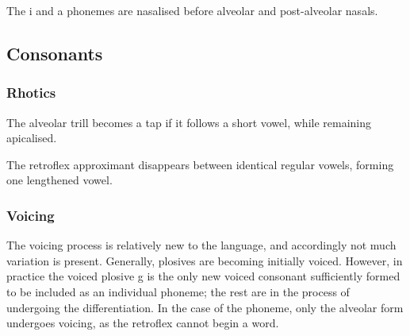 \begin{quote}
\end{quote}

The i and a phonemes are nasalised before alveolar and post-alveolar nasals.

\begin{quote}
\begin{multicols}{2}
\phonc{i}{\textipa{\~i}}{\oneof{\phold \textipa{\|]{n}}\\ \phold
    \textipa{\textsubsquare{n}}}}

\phonc{a}{\textipa{\~a}}{\oneof{\phold \textipa{\|]{n}}\\ \phold
    \textipa{\textsubsquare{n}}}}
\end{multicols}
\end{quote}

\subsection{Consonants}

\subsubsection{Rhotics}

The alveolar trill becomes a tap if it follows a short vowel, while remaining
apicalised.

\begin{quote}
\phonl{\textipa{\|]r}}{\textipa{\|]R}}{\oneof{a\\u\\i}}
\end{quote}

The retroflex approximant \textipa{\textturnrrtail} disappears between identical
regular vowels, forming one lengthened vowel.

\begin{quote}
\end{quote}

\subsubsection{Voicing}

The voicing process is relatively new to the language, and accordingly not much
variation is present. Generally, plosives are becoming initially voiced.
However, in practice the voiced plosive g is the only new voiced consonant
sufficiently formed to be included as an individual phoneme; the rest are in the
process of undergoing the differentiation. In the case of the \textipa{\|]{t}}
phoneme, only the alveolar form undergoes voicing, as the retroflex cannot begin
a word.

